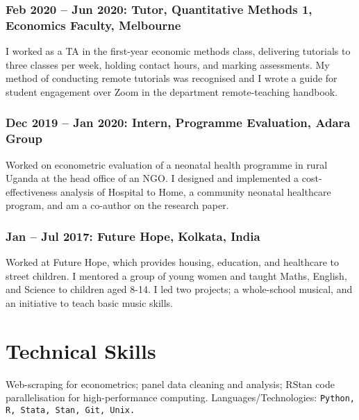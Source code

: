 \documentclass[a4]{article}
\begin{document}
\subsubsection*{Feb 2020 -- Jun 2020: Tutor, Quantitative Methods 1, Economics Faculty, Melbourne}
I worked as a TA in the first-year economic methods class, delivering tutorials to three classes per week, holding contact hours, and marking assessments. My method of conducting remote tutorials was recognised and I wrote a guide for student engagement over Zoom in the department remote-teaching handbook.

\subsubsection*{Dec 2019 -- Jan 2020: Intern, Programme Evaluation, Adara Group}
Worked on econometric evaluation of a neonatal health programme in rural Uganda at the head office of an NGO. I designed and implemented a cost-effectiveness analysis of Hospital to Home, a community neonatal healthcare program, and am a co-author on the research paper.
\subsubsection*{Jan -- Jul 2017: Future Hope, Kolkata, India}
Worked at Future Hope, which provides housing, education, and healthcare to street children. I mentored a group of young women and taught Maths, English, and Science to children aged 8-14. I led two projects; a whole-school musical, and an initiative to teach basic music skills.

\section*{Technical Skills}
Web-scraping for econometrics; panel data cleaning and analysis; RStan code parallelisation for high-performance computing.  Languages/Technologies: \texttt{Python, R, Stata, Stan, Git, Unix.}
\end{document}
